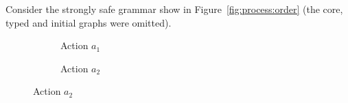 \begin{example} Consider the strongly safe grammar show in Figure~\ref{fig:process:order} (the core, typed and initial graphs were omitted). 
  
\begin{figure}[!ht]
  \centering
  \begin{subfigure}[t]{.5\textwidth}
    \centerline{}
    \caption{Action $a_1$}\label{fig:process:order:a1}
  \end{subfigure}%
  \begin{subfigure}[t]{.5\textwidth}
    \centerline{}
    \caption{Action $a_2$}\label{fig:process:order:a2}
  \end{subfigure}


\end{figure}
\end{example}
